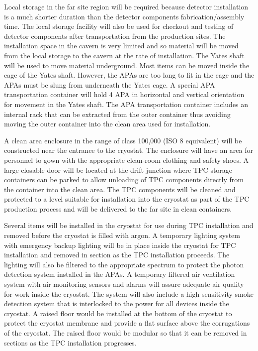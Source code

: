 Local storage in the far site region will be required because detector
installation is a much shorter duration than the detector components
fabrication/assembly time. The local storage facility will also be
used for checkout and testing of detector components after
transportation from the production sites. The installation space in
the cavern is very limited and so material will be moved from the
local storage to the cavern at the rate of installation. The Yates
shaft will be used to move material underground. Most items can be
moved inside the cage of the Yates shaft. However, the APAs are too
long to fit in the cage and the APAs must be slung from underneath the
Yates cage. A special APA transportation container will hold 4 APA in
horizontal and vertical orientation for movement in the Yates shaft.
The APA transportation container includes an internal rack that can be
extracted from the outer container thus avoiding moving the outer
container into the clean area used for installation.

A clean area enclosure in the range of class 100,000 (ISO 8
equivalent) will be constructed near the entrance to the cryostat. The
enclosure will have an area for personnel to gown with the appropriate
clean-room clothing and safety shoes. A large closable door will be
located at the drift junction where TPC storage containers can be
parked to allow unloading of TPC components directly from the
container into the clean area. The TPC components will be cleaned and
protected to a level suitable for installation into the cryostat as
part of the TPC production process and will be delivered to the far
site in clean containers.

Several items will be installed in the cryostat for use during TPC
installation and removed before the cryostat is filled with argon. A
temporary lighting system with emergency backup lighting will be in
place inside the cryostat for TPC installation and removed in section
as the TPC installation proceeds. The lighting will also be filtered
to the appropriate spectrum to protect the photon detection system
installed in the APAs. A temporary filtered air ventilation system
with air monitoring sensors and alarms will assure adequate air
quality for work inside the cryostat. The system will also include a
high sensitivity smoke detection system that is interlocked to the
power for all devices inside the cryostat. A raised floor would be
installed at the bottom of the cryostat to protect the cryostat
membrane and provide a flat surface above the corrugations of the
cryostat. The raised floor would be modular so that it can be removed
in sections as the TPC installation progresses.

